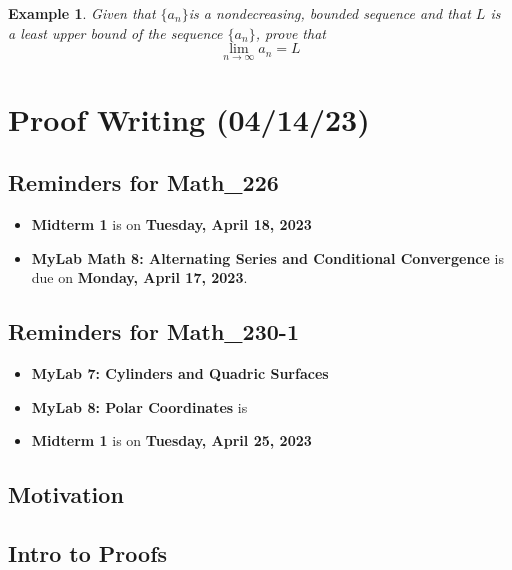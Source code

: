 \documentclass{report}
\newtheorem*{remark*}{Example}
\begin{document}
\begin{sloppypar}
\begin{center}
\end{center}




\begin{remark*}
  Given that $ \{a_{n}\} $is a nondecreasing, bounded
  sequence and that $ L $ is a least upper bound of the
  sequence $ \{a_{n}\}$, prove that
  \[ \lim_{n \rightarrow \infty} a_{n} = L \]
\end{remark*}
\begin{center}
  \graphic
\end{center}


\chapter{Proof Writing (04/14/23)}
\section{Reminders for Math\_226}
\begin{itemize}
  \item \textbf{Midterm 1} is on \textbf{Tuesday, April 18, 2023}
  \item \textbf{MyLab Math 8: Alternating Series and Conditional Convergence} is due
        on \textbf{Monday, April 17, 2023}.

\end{itemize}
\section{Reminders for Math\_230-1}
\begin{itemize}
  \item \textbf{MyLab 7: Cylinders and Quadric Surfaces}
  \item \textbf{MyLab 8: Polar Coordinates} is
        \item \textbf{Midterm 1} is on \textbf{Tuesday, April 25, 2023}
\end{itemize}

\section{Motivation}
\section{Intro to Proofs}

\end{sloppypar}
\end{document}
